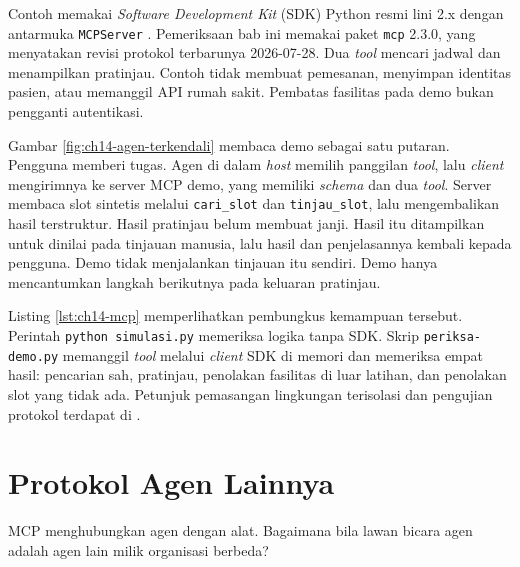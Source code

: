 \begin{pendalaman}[title={Pendalaman Teknis (opsional): MCP Lokal dengan Data Sintetis}]
Contoh memakai \textit{Software Development Kit} (SDK) Python resmi lini 2.x dengan antarmuka \texttt{MCPServer} \cite{c14-sdk}. Pemeriksaan bab ini memakai paket
\texttt{mcp} 2.3.0, yang menyatakan revisi protokol terbarunya 2026-07-28. Dua \textit{tool} mencari jadwal dan menampilkan pratinjau. Contoh tidak membuat pemesanan,
menyimpan identitas pasien, atau memanggil API rumah sakit. Pembatas fasilitas pada demo bukan pengganti autentikasi.

Gambar \ref{fig:ch14-agen-terkendali} membaca demo sebagai satu putaran. Pengguna memberi tugas. Agen di dalam \textit{host} memilih panggilan \textit{tool}, lalu
\textit{client} mengirimnya ke server MCP demo, yang memiliki \textit{schema} dan dua \textit{tool}. Server membaca slot sintetis melalui \texttt{cari\_slot} dan
\texttt{tinjau\_slot}, lalu mengembalikan hasil terstruktur. Hasil pratinjau belum membuat janji. Hasil itu ditampilkan untuk dinilai pada tinjauan manusia, lalu hasil
dan penjelasannya kembali kepada pengguna. Demo tidak menjalankan tinjauan itu sendiri. Demo hanya mencantumkan langkah berikutnya pada keluaran pratinjau.

Listing \ref{lst:ch14-mcp} memperlihatkan pembungkus kemampuan tersebut. Perintah \texttt{python simulasi.py} memeriksa logika tanpa SDK. Skrip
\texttt{periksa-demo.py} memanggil \textit{tool} melalui \textit{client} SDK di memori dan memeriksa empat hasil: pencarian sah, pratinjau, penolakan fasilitas di luar
latihan, dan penolakan slot yang tidak ada. Petunjuk pemasangan lingkungan terisolasi dan pengujian protokol terdapat di
.


\end{pendalaman}

\section{Protokol Agen Lainnya}

MCP menghubungkan agen dengan alat. Bagaimana bila lawan bicara agen adalah agen lain milik organisasi berbeda?


